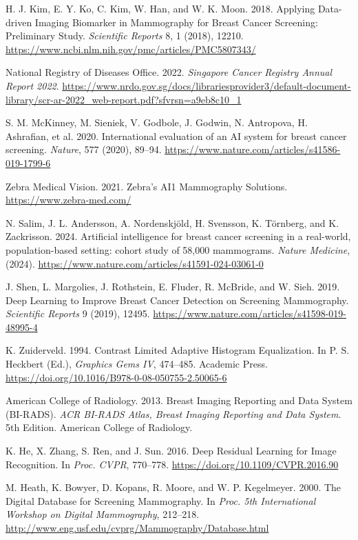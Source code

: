 \documentclass[12pt]{article}
\begin{document}
\begin{thebibliography}{99}
    H. J. Kim, E. Y. Ko, C. Kim, W. Han, and W. K. Moon. 2018. Applying Data-driven Imaging Biomarker in Mammography for Breast Cancer Screening: Preliminary Study. \textit{Scientific Reports} 8, 1 (2018), 12210. \url{https://www.ncbi.nlm.nih.gov/pmc/articles/PMC5807343/}
    
    National Registry of Diseases Office. 2022. \textit{Singapore Cancer Registry Annual Report 2022}. \url{https://www.nrdo.gov.sg/docs/librariesprovider3/default-document-library/scr-ar-2022_web-report.pdf?sfvrsn=a9eb8c10_1}

    S. M. McKinney, M. Sieniek, V. Godbole, J. Godwin, N. Antropova, H. Ashrafian, et al. 2020. International evaluation of an AI system for breast cancer screening. \textit{Nature}, 577 (2020), 89–94. \url{https://www.nature.com/articles/s41586-019-1799-6}

    Zebra Medical Vision. 2021. Zebra’s AI1 Mammography Solutions. \url{https://www.zebra-med.com/}

    N. Salim, J. L. Andersson, A. Nordenskjöld, H. Svensson, K. Törnberg, and K. Zackrisson. 2024. Artificial intelligence for breast cancer screening in a real-world, population-based setting: cohort study of 58,000 mammograms. \textit{Nature Medicine}, (2024). \url{https://www.nature.com/articles/s41591-024-03061-0}

    J. Shen, L. Margolies, J. Rothstein, E. Fluder, R. McBride, and W. Sieh. 2019. Deep Learning to Improve Breast Cancer Detection on Screening Mammography. \textit{Scientific Reports} 9 (2019), 12495. \url{https://www.nature.com/articles/s41598-019-48995-4}

    K. Zuiderveld. 1994. Contrast Limited Adaptive Histogram Equalization. In P. S. Heckbert (Ed.), \textit{Graphics Gems IV}, 474–485. Academic Press. \url{https://doi.org/10.1016/B978-0-08-050755-2.50065-6}

    American College of Radiology. 2013. Breast Imaging Reporting and Data System (BI-RADS). \textit{ACR BI-RADS Atlas, Breast Imaging Reporting and Data System}. 5th Edition. American College of Radiology.

    K. He, X. Zhang, S. Ren, and J. Sun. 2016. Deep Residual Learning for Image Recognition. In \textit{Proc. CVPR}, 770–778. \url{https://doi.org/10.1109/CVPR.2016.90}

    M. Heath, K. Bowyer, D. Kopans, R. Moore, and W. P. Kegelmeyer. 2000. The Digital Database for Screening Mammography. In \textit{Proc. 5th International Workshop on Digital Mammography}, 212–218. \url{http://www.eng.usf.edu/cvprg/Mammography/Database.html}


\end{thebibliography}
\end{document}
